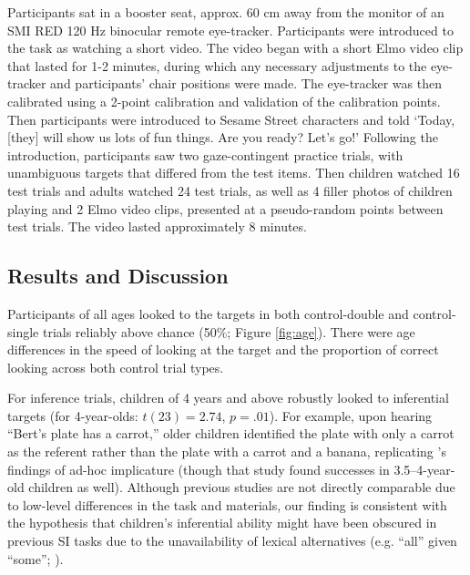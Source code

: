 \documentclass[10pt,letterpaper]{article}
\begin{document}
Participants sat in a booster seat, approx. 60 cm away from the monitor of an SMI RED 120 Hz binocular remote eye-tracker. Participants were introduced to the task as watching a short video. The video began with a short Elmo video clip that lasted for 1-2 minutes, during which any necessary adjustments to the eye-tracker and participants' chair positions were made. The eye-tracker was then calibrated using a 2-point calibration and validation of the calibration points. Then participants were introduced to Sesame Street characters and told `Today, [they] will show us lots of fun things. Are you ready? Let's go!' Following the introduction, participants saw two gaze-contingent practice trials, with unambiguous targets that differed from the test items. Then children watched 16 test trials and adults watched 24 test trials, as well as 4 filler photos of children playing and 2 Elmo video clips, presented at a pseudo-random points between test trials. The video lasted approximately 8 minutes.

\subsection{Results and Discussion}



Participants of all ages looked to the targets in both control-double and control-single trials reliably above chance (50\%; Figure \ref{fig:age}). There were age differences in the speed of looking at the target and the proportion of correct looking across both control trial types.

For inference trials, children of 4 years and above robustly looked to inferential targets (for 4-year-olds: $t(23) = 2.74$, $p =.01$). For example, upon hearing ``Bert's plate has a carrot,'' older children identified the plate with only a carrot as the referent rather than the plate with a carrot and a banana, replicating 's findings of ad-hoc implicature (though that study found successes in 3.5--4-year-old children as well). Although previous studies are not directly comparable due to low-level differences in the task and materials, our finding is consistent with the hypothesis that children's inferential ability might have been obscured in previous SI tasks due to the unavailability of lexical alternatives (e.g. ``all'' given ``some''; ).
\end{document}
